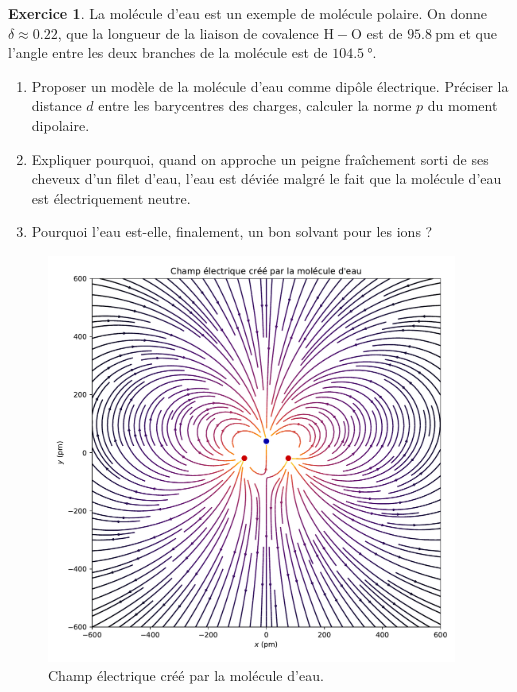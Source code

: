 \documentclass{article}
\theoremstyle{definition}
\newtheorem{exo}{Exercice}
\theoremstyle{remark}
\begin{document}
\begin{exo}
	La molécule d'eau est un exemple de molécule polaire. On donne $\delta\approx\num{0.22}$, que la longueur de la liaison de covalence $\mathrm{H}-\mathrm{O}$ est de $\SI{95.8}{\pico\meter}$ et que l'angle entre les deux branches de la molécule est de $\SI{104.5}{°}$.
	\begin{enumerate}
		\item Proposer un modèle de la molécule d'eau comme dipôle électrique. Préciser la distance $d$ entre les barycentres des charges, calculer la norme $p$ du moment dipolaire.
		\item Expliquer pourquoi, quand on approche un peigne fraîchement sorti de ses cheveux d'un filet d'eau, l'eau est déviée malgré le fait que la molécule d'eau est électriquement neutre.
		\item Pourquoi l'eau est-elle, finalement, un bon solvant pour les ions ?
	\end{enumerate}

\begin{figure}[h]
	\centering
	\includegraphics[width=0.96\textwidth]{parts/electrostat/Champ_dipole_eau.pdf}
	\caption{Champ électrique créé par la molécule d'eau.}
\end{figure}

\end{exo}
\end{document}
